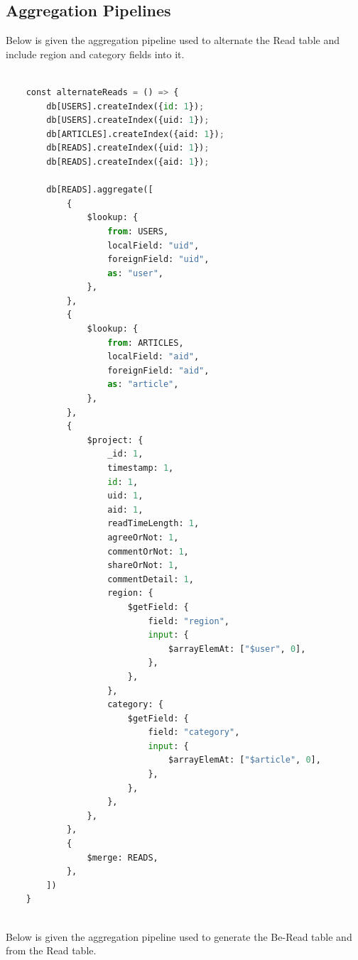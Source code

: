 \documentclass{article}
\begin{document}
    \subsection{Aggregation Pipelines}\label{subsec:appendix-aggregation}
    Below is given the aggregation pipeline used to alternate the Read table and include region and category fields into it.
    \begin{lstlisting}[language=Python, caption=Aggregation pipeline for alternating Read table]
    
    const alternateReads = () => {
        db[USERS].createIndex({id: 1});
        db[USERS].createIndex({uid: 1});
        db[ARTICLES].createIndex({aid: 1});
        db[READS].createIndex({uid: 1});
        db[READS].createIndex({aid: 1});
    
        db[READS].aggregate([
            {
                $lookup: {
                    from: USERS,
                    localField: "uid",
                    foreignField: "uid",
                    as: "user",
                },
            },
            {
                $lookup: {
                    from: ARTICLES,
                    localField: "aid",
                    foreignField: "aid",
                    as: "article",
                },
            },
            {
                $project: {
                    _id: 1,
                    timestamp: 1,
                    id: 1,
                    uid: 1,
                    aid: 1,
                    readTimeLength: 1,
                    agreeOrNot: 1,
                    commentOrNot: 1,
                    shareOrNot: 1,
                    commentDetail: 1,
                    region: {
                        $getField: {
                            field: "region",
                            input: {
                                $arrayElemAt: ["$user", 0],
                            },
                        },
                    },
                    category: {
                        $getField: {
                            field: "category",
                            input: {
                                $arrayElemAt: ["$article", 0],
                            },
                        },
                    },
                },
            },
            {
                $merge: READS,
            },
        ])
    }
    
    \end{lstlisting}
     Below is given the aggregation pipeline used to generate the Be-Read table and from the Read table.
\end{document}
